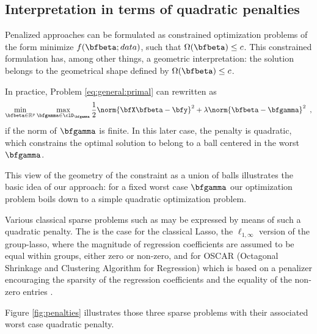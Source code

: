 \subsection{Interpretation in terms of quadratic penalties}

Penalized approaches can be formulated as constrained optimization
problems of the form minimize $f (\bfbeta; data)$, such that $\Omega(\bfbeta)
\leq c$. 
This constrained formulation has, among other things, a geometric interpretation: 
the solution belongs to the geometrical shape defined by  $\Omega(\bfbeta)\leq c$.

In practice, Problem \eqref{eq:general:primal} can rewritten as
%
\begin{equation}\label{eq:general:dual}
  \min_{\bfbeta\in\mathbb{R}^p} \max_{\bfgamma \in \clD_{\bfgamma}}
    \frac{1}{2} \norm{\bfX \bfbeta - \bfy}^2 + \lambda \norm{\bfbeta - \bfgamma}^2
  \enspace,
\end{equation}
%
if the norm of $\bfgamma$ is finite.  In this later case, the penalty
is quadratic, which constrains the optimal solution to belong to a ball
centered in the worst $\bfgamma$. 

This view of the geometry of the constraint as a union of balls 
illustrates the basic idea of our approach: for a fixed worst case $\bfgamma$ 
our optimization problem boils down to a simple quadratic optimization problem. 

Various classical sparse problems such as may be expressed by means of
such a quadratic penalty. The is the case for the classical Lasso,
the $\ell_{1,\infty}$ version of the group-lasso, where the
magnitude of regression coefficients are assumed to be equal within groups,
either zero or non-zero, and for OSCAR (Octagonal Shrinkage and Clustering
Algorithm for Regression) which is based on a penalizer encouraging the
sparsity of the regression coefficients and the equality of the
non-zero entries \citep{Bondell08}.  


Figure \ref{fig:penalties} illustrates  those three  sparse problems
with their  associated worst case quadratic penalty.


